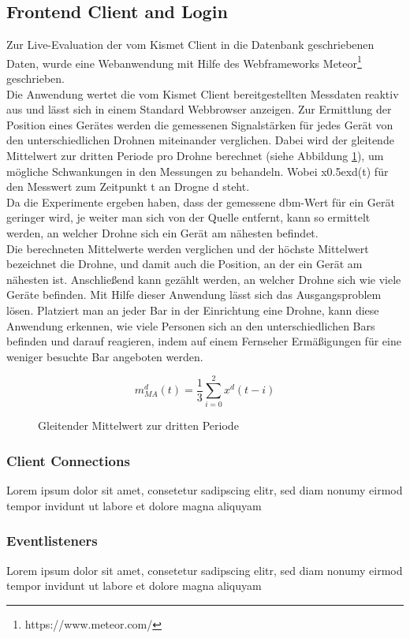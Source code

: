 \documentclass[a4paper]{spie}  %
\begin{document}
\subsection{Frontend Client and Login}
Zur Live-Evaluation der vom Kismet Client in die Datenbank geschriebenen Daten, wurde eine Webanwendung mit Hilfe des Webframeworks Meteor\footnote{https://www.meteor.com/} geschrieben. \\
Die Anwendung wertet die vom Kismet Client bereitgestellten Messdaten reaktiv aus und lässt sich in einem Standard Webbrowser anzeigen. 
Zur Ermittlung der Position eines Gerätes werden die gemessenen Signalstärken für jedes Gerät von den unterschiedlichen Drohnen miteinander verglichen. Dabei wird der gleitende Mittelwert zur dritten Periode pro Drohne berechnet (siehe Abbildung \ref{eqn:middle}), um mögliche Schwankungen in den Messungen zu behandeln. Wobei x\raise0.5ex\hbox{d}(t) für den Messwert zum Zeitpunkt t an Drogne d steht.
\\Da die Experimente ergeben haben, dass der gemessene dbm-Wert für ein Gerät geringer wird, je weiter man sich von der Quelle entfernt, kann so ermittelt werden, an welcher Drohne sich ein Gerät am nähesten befindet. \\
Die berechneten Mittelwerte werden verglichen und der höchste Mittelwert bezeichnet die Drohne, und damit auch die Position, an der ein Gerät am nähesten ist. Anschließend kann gezählt werden, an welcher Drohne sich wie viele Geräte befinden. Mit Hilfe dieser Anwendung lässt sich das Ausgangsproblem lösen. Platziert man an jeder Bar in der Einrichtung eine Drohne, kann diese Anwendung erkennen, wie viele Personen sich an den unterschiedlichen Bars befinden und darauf reagieren, indem auf einem Fernseher Ermäßigungen für eine weniger besuchte Bar angeboten werden.
\begin{figure}
\begin{equation}
  \boxed{{ m }_{ MA }^{ d }(t) = \frac { 1 }{ 3 } \sum _{ i=0 }^{ 2 }{ { x }^{ d }(t-i) }}
\end{equation}
\caption{Gleitender Mittelwert zur dritten Periode}
\label{eqn:middle}
\end{figure}

\subsubsection{Client Connections}
Lorem ipsum dolor sit amet, consetetur sadipscing elitr, sed diam nonumy eirmod tempor invidunt ut labore et dolore magna aliquyam
\subsubsection{Eventlisteners}
Lorem ipsum dolor sit amet, consetetur sadipscing elitr, sed diam nonumy eirmod tempor invidunt ut labore et dolore magna aliquyam
\end{document}
